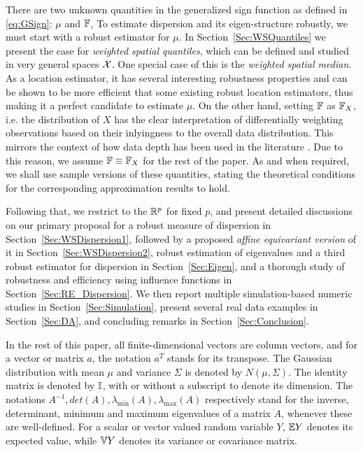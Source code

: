 There are two unknown quantities in the generalized sign function as defined in \eqref{eq:GSign}: $\mu$ and ${\mathbb{F}}$, To estimate dispersion and its eigen-structure robustly, we must start with a robust estimator for $\mu$. In Section~\ref{Sec:WSQuantiles} we present the case for \textit{weighted spatial quantiles}, which can be defined and studied in very general spaces 
$\mathcal{X}$. One special case of this is the {\it weighted spatial median}. As a location estimator, it has several interesting robustness properties and can be shown to be more efficient that some existing robust location estimators, thus making it a perfect candidate to estimate $\mu$. On the other hand, setting ${\mathbb{F}}$ as ${\mathbb{F}}_X$, i.e. the distribution of $X$ has the clear interpretation of differentially weighting observations based on their inlyingness to the overall data distribution. This mirrors the context of how data depth has been used in the literature \cite{LiuPareliusSingh99, ref:DIMACS061_Serfling}. Due to this reason, we assume ${\mathbb{F}} \equiv {\mathbb{F}}_X$ for the rest of the paper. As and when required, we shall use sample versions of these quantities, stating the theoretical conditions for the corresponding approximation results to hold.

Following that, we restrict to the ${\mathbb{R}}^{p}$ for fixed $p$, and present detailed discussions on our primary proposal for a  robust measure of dispersion in Section~\ref{Sec:WSDispersion1}, followed by a proposed \textit{ affine equivariant version} of it in Section~\ref{Sec:WSDispersion2}, robust estimation of eigenvalues and a third robust estimator for dispersion in Section~\ref{Sec:Eigen}, and a thorough study of robustness and efficiency using influence functions in Section~\ref{Sec:RE_Dispersion}. We then report multiple simulation-based numeric studies in Section~\ref{Sec:Simulation}, present several real data examples in Section~\ref{Sec:DA}, and concluding remarks in Section~\ref{Sec:Conclusion}.

In the rest of this paper, all finite-dimensional vectors are column vectors, and for a vector or matrix $a$, the notation $a^{T}$ stands for its transpose. The Gaussian distribution with mean $\mu$ and variance $\Sigma$ is denoted by $N (\mu, \Sigma)$. The identity matrix  is denoted by ${\mathbb{I}}$, with or without a subscript to denote its dimension. The notations $A^{-1}, det (A), \lambda_{\min} (A), \lambda_{\max} (A)$ respectively stand for the inverse, determinant, minimum and maximum eigenvalues of a matrix $A$, whenever these are well-defined. For a scalar or vector valued random variable $Y$, ${\mathbb{E}} Y$ denotes its expected value, while ${\mathbb{V}} Y$ denotes its variance or covariance matrix.